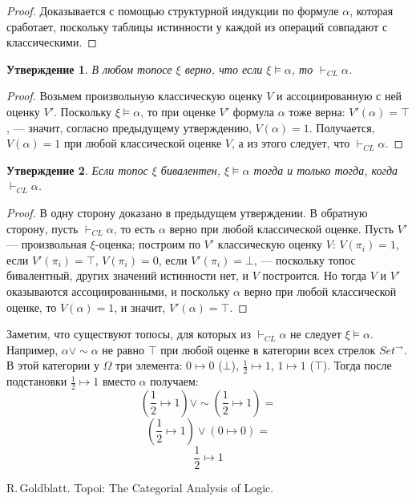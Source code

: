 \documentclass[a4paper, 12pt]{article}
\newtheorem{exercise}{Утверждение}
\begin{document}
\begin{proof}
Доказывается с помощью структурной индукции по формуле $\alpha$, которая сработает, поскольку таблицы истинности у каждой из операций совпадают с классическими. 
\end{proof}

\begin{exercise}
В любом топосе $\xi$ верно, что если $\xi\models\alpha$, то $\vdash_{CL}\alpha$. 
\end{exercise}
\begin{proof}
Возьмем произвольную классическую оценку $V$ и ассоциированную с ней оценку $V'$. Поскольку $\xi\models\alpha$, то при оценке $V'$ формула $\alpha$ тоже верна: $V'(\alpha)=\top$, --- значит, согласно предыдущему утверждению, $V(\alpha) = 1$. Получается, $V(\alpha) = 1$ при любой классической оценке $V$, а из этого следует, что $\vdash_{CL}\alpha$.
\end{proof}

\begin{exercise}
Если топос $\xi$ бивалентен, $\xi\models\alpha$ тогда и только тогда, когда $\vdash_{CL}\alpha$. 
\end{exercise}
\begin{proof}
В одну сторону доказано в предыдущем утверждении. В обратную сторону, пусть $\vdash_{CL}\alpha$, то есть $\alpha$ верно при любой классической оценке. Пусть $V'$ --- произвольная $\xi$-оценка; построим по $V'$ классическую оценку $V$: $V(\pi_i)=1$, если $V'(\pi_i)=\top$, $V(\pi_i)=0$, если $V'(\pi_i)=\bot$, --- поскольку топос бивалентный, других значений истинности нет, и $V$ построится. Но тогда $V$ и $V'$ оказываются ассоциированными, и поскольку $\alpha$ верно при любой классической оценке, то $V(\alpha)=1$, и значит, $V'(\alpha)=\top$.
\end{proof}

Заметим, что существуют топосы, для которых из $\vdash_{CL}\alpha$ не следует $\xi\models\alpha$. Например, $\alpha\vee\sim\alpha$ не равно $\top$ при любой оценке в категории всех стрелок $Set^\to$. В этой категории у $\Omega$ три элемента: $0\mapsto 0$ ($\bot$), $\frac{1}{2}\mapsto 1$, $1\mapsto 1$ ($\top$). Тогда после подстановки $\frac{1}{2}\mapsto 1$ вместо $\alpha$ получаем:
  $$(\frac{1}{2}\mapsto 1)\vee\sim(\frac{1}{2}\mapsto 1) = $$
  $$(\frac{1}{2}\mapsto 1)\vee(0\mapsto 0) = $$
  $$\frac{1}{2}\mapsto 1 $$

\pagebreak


\begin{thebibliography}{99}
R.\,Goldblatt.
Topoi: The Categorial Analysis of Logic.
\end{thebibliography}
\end{document}
